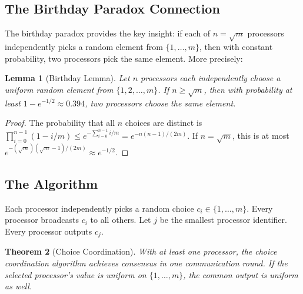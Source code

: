 \documentclass[twoside,12pt]{book}
\theoremstyle{plain}
\newtheorem{theorem}{Theorem}[chapter]
\newtheorem{lemma}[theorem]{Lemma}
\theoremstyle{definition}
\theoremstyle{remark}
\begin{document}
\subsection{The Birthday Paradox Connection}
\label{subsec:birthday-connection}

The birthday paradox provides the key insight: if each of $n = \sqrt{m}$ processors independently picks a random element from $\{1, \ldots, m\}$, then with constant probability, two processors pick the same element. More precisely:

\begin{lemma}[Birthday Lemma]
\label{lem:birthday}
Let $n$ processors each independently choose a uniform random element from $\{1, 2, \ldots, m\}$. If $n \geq \sqrt{m}$, then with probability at least $1 - e^{-1/2} \approx 0.394$, two processors choose the same element.
\end{lemma}

\begin{proof}
The probability that all $n$ choices are distinct is $\prod_{i=0}^{n-1}(1 - i/m) \leq e^{-\sum_{i=0}^{n-1} i/m} = e^{-n(n-1)/(2m)}$. If $n = \sqrt{m}$, this is at most $e^{-(\sqrt{m})(\sqrt{m}-1)/(2m)} \approx e^{-1/2}$.
\end{proof}

\subsection{The Algorithm}
\label{subsec:choice-algorithm}

\begin{algorithm}[H]
\caption{Choice Coordination Algorithm}
\label{alg:choice}
\begin{algorithmic}[1]
\State Each processor independently picks a random choice $c_i \in \{1,\ldots,m\}$.
\State Every processor broadcasts $c_i$ to all others.
\State Let $j$ be the smallest processor identifier.
\State Every processor outputs $c_j$.
\EndProcedure
\end{algorithmic}
\end{algorithm}

\begin{theorem}[Choice Coordination]
\label{thm:choice}
With at least one processor, the choice coordination algorithm achieves
consensus in one communication round. If the selected processor's value is
uniform on $\{1,\ldots,m\}$, the common output is uniform as well.
\end{theorem}
\end{document}
